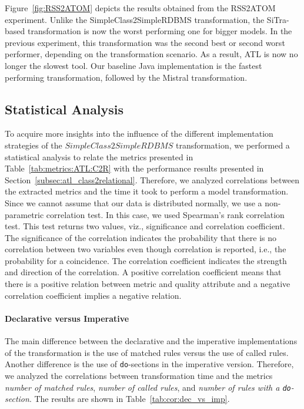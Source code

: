 \documentclass[12pt]{elsarticle}
\begin{document}
Figure~\ref{fig:RSS2ATOM} depicts the results obtained from the RSS2ATOM
experiment. Unlike the SimpleClass2SimpleRDBMS transformation,
the SiTra-based transformation is now the worst performing one for bigger
models. In the previous experiment, this transformation was the second best or
second worst performer, depending on the transformation scenario. As a result, ATL is now no longer the slowest tool. Our baseline
Java implementation is the fastest performing transformation, followed by
the Mistral transformation.

\subsection{Statistical Analysis}
To acquire more insights into the influence of the different implementation
strategies of the $SimpleClass2SimpleRDBMS$ transformation, we performed a
statistical analysis to relate the metrics presented in
Table~\ref{tab:metrics:ATL:C2R} with the performance results presented in
Section~\ref{subsec:atl_class2relational}. Therefore, we analyzed
correlations between the extracted metrics and the time it took to perform a
model transformation. Since we cannot assume that our data is distributed
normally, we use a non-parametric correlation test. In this case, we used
Spearman's rank correlation test. This test returns two values, viz.,
significance and correlation coefficient. The significance of the correlation
indicates the probability that there is no correlation between two variables
even though correlation is reported, i.e., the probability for a coincidence.
The correlation coefficient indicates the strength and direction of the
correlation. A positive correlation coefficient means that there is a positive
relation between metric and quality attribute and a negative correlation
coefficient implies a negative relation.


\paragraph{Declarative versus Imperative}
The main difference between the declarative and the imperative implementations
of the transformation is the use of matched rules versus the use of called
rules. Another difference is the use of \texttt{do}-sections in the imperative
version. Therefore, we analyzed the correlations between transformation time and
the metrics \emph{number of matched rules}, \emph{number of called rules}, and
\emph{number of rules with a \texttt{do}-section}. The results are shown in
Table~\ref{tab:cor:dec_vs_imp}.\\
\end{document}
